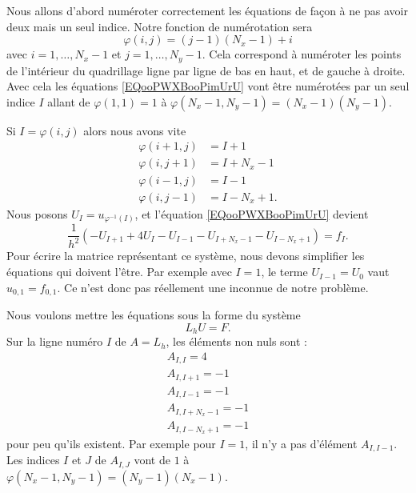 Nous allons d'abord numéroter correctement les équations de façon à ne pas avoir deux mais un seul indice. Notre fonction de numérotation sera
\begin{equation}
	\varphi(i,j)=(j-1)(N_x-1)+i
\end{equation}
avec \( i=1,\ldots, N_x-1\) et \( j=1,\ldots, N_y-1\). Cela correspond à numéroter les points de l'intérieur du quadrillage ligne par ligne de bas en haut, et de gauche à droite. Avec cela les équations \eqref{EQooPWXBooPimUrU} vont être numérotées par un seul indice \( I\) allant de \( \varphi(1,1)=1\) à \( \varphi(N_x-1,N_y-1)=(N_x-1)(N_y-1)\).

Si \( I=\varphi(i,j)\) alors nous avons vite
\begin{subequations}
	\begin{align}
		\varphi(i+1,j) & =I+1      \\
		\varphi(i,j+1) & =I+N_x-1  \\
		\varphi(i-1,j) & =I-1      \\
		\varphi(i,j-1) & =I-N_x+1.
	\end{align}
\end{subequations}
Nous posons \( U_I=u_{\varphi^{-1}(I)}\), et l'équation \eqref{EQooPWXBooPimUrU} devient
\begin{equation}
	\frac{1}{ h^2 }(-U_{I+1}+4U_I-U_{I-1}-U_{I+N_x-1}-U_{I-N_x+1})=f_I.
\end{equation}
Pour écrire la matrice représentant ce système, nous devons simplifier les équations qui doivent l'être. Par exemple avec \( I=1\), le terme \( U_{I-1}=U_0\) vaut \( u_{0,1}=f_{0,1}\). Ce n'est donc pas réellement une inconnue de notre problème.

Nous voulons mettre les équations sous la forme du système
\begin{equation}
	L_hU=F.
\end{equation}
Sur la ligne numéro \( I\) de \( A=L_h\), les éléments non nuls sont :
\begin{subequations}        \label{SUBEQQooSRQNooYrCNhj}
	\begin{align}
		A_{I,I}=4        \\
		A_{I,I+1}=-1     \\
		A_{I,I-1}=-1     \\
		A_{I,I+N_x-1}=-1 \\
		A_{I,I-N_x+1}=-1
	\end{align}
\end{subequations}
pour peu qu'ils existent. Par exemple pour \( I=1\), il n'y a pas d'élément \( A_{I,I-1}\). Les indices \( I\) et \( J\) de \( A_{I,J}\) vont de \( 1\) à \( \varphi(N_x-1,N_y-1)=(N_y-1)(N_x-1)\).

